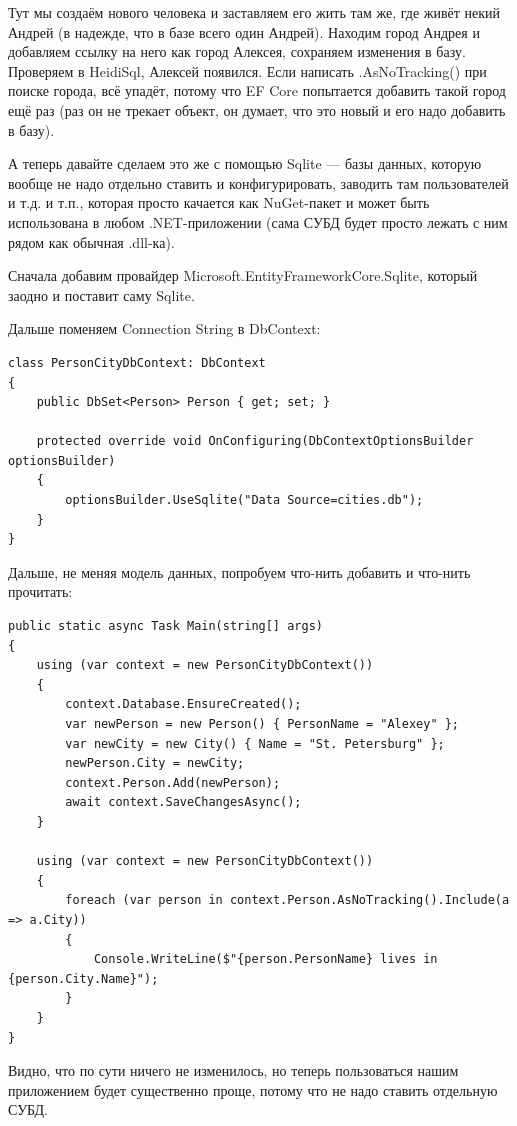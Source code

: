 \documentclass{../../text-style}
\begin{document}
Тут мы создаём нового человека и заставляем его жить там же, где живёт некий Андрей (в надежде, что в базе всего один Андрей). Находим город Андрея и добавляем ссылку на него как город Алексея, сохраняем изменения в базу. Проверяем в HeidiSql, Алексей появился. Если написать .AsNoTracking() при поиске города, всё упадёт, потому что EF Core попытается добавить такой город ещё раз (раз он не трекает объект, он думает, что это новый и его надо добавить в базу).

А теперь давайте сделаем это же с помощью Sqlite --- базы данных, которую вообще не надо отдельно ставить и конфигурировать, заводить там пользователей и т.д. и т.п., которая просто качается как NuGet-пакет и  может быть использована в любом .NET-приложении (сама СУБД будет просто лежать с ним рядом как обычная .dll-ка).

Сначала добавим провайдер Microsoft.EntityFrameworkCore.Sqlite, который заодно и поставит саму Sqlite.

Дальше поменяем Connection String в DbContext:

\begin{verbatim}
class PersonCityDbContext: DbContext
{
    public DbSet<Person> Person { get; set; }

    protected override void OnConfiguring(DbContextOptionsBuilder optionsBuilder)
    {
        optionsBuilder.UseSqlite("Data Source=cities.db");
    }
}
\end{verbatim}

Дальше, не меняя модель данных, попробуем что-нить добавить и что-нить прочитать:

\begin{verbatim}
public static async Task Main(string[] args)
{
    using (var context = new PersonCityDbContext())
    {
        context.Database.EnsureCreated();
        var newPerson = new Person() { PersonName = "Alexey" };
        var newCity = new City() { Name = "St. Petersburg" };
        newPerson.City = newCity;
        context.Person.Add(newPerson);
        await context.SaveChangesAsync();
    }

    using (var context = new PersonCityDbContext())
    {
        foreach (var person in context.Person.AsNoTracking().Include(a => a.City))
        {
            Console.WriteLine($"{person.PersonName} lives in {person.City.Name}");
        }
    }
}
\end{verbatim}

Видно, что по сути ничего не изменилось, но теперь пользоваться нашим приложением будет существенно проще, потому что не надо ставить отдельную СУБД.
\end{document}
